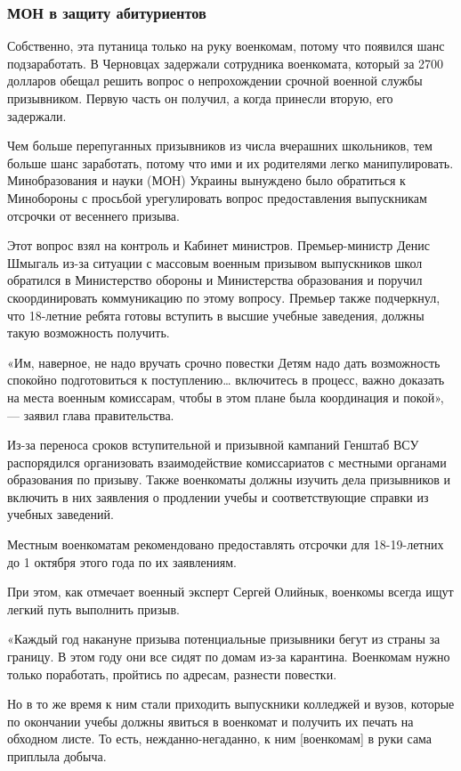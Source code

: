 \documentclass[a4paper,11pt]{extreport}
\begin{document}
\subsubsection{МОН в защиту абитуриентов }

Собственно, эта путаница только на руку военкомам, потому что появился шанс
подзаработать. В Черновцах задержали сотрудника военкомата, который за 2700
долларов обещал решить вопрос о непрохождении срочной военной службы
призывником. Первую часть он получил, а когда принесли вторую, его задержали. 

Чем больше перепуганных призывников из числа вчерашних школьников, тем больше
шанс заработать, потому что ими и их родителями легко манипулировать.
Минобразования и науки (МОН) Украины вынуждено было обратиться к Минобороны с
просьбой урегулировать вопрос предоставления выпускникам отсрочки от весеннего
призыва. 

Этот вопрос взял на контроль и Кабинет министров. Премьер-министр Денис Шмыгаль
из-за ситуации с массовым военным призывом выпускников школ обратился в
Министерство обороны и Министерства образования и поручил скоординировать
коммуникацию по этому вопросу. Премьер также подчеркнул, что 18-летние ребята
готовы вступить в высшие учебные заведения, должны такую возможность получить. 

«Им, наверное, не надо вручать срочно повестки Детям надо дать возможность
спокойно подготовиться к поступлению… включитесь в процесс, важно доказать на
места военным комиссарам, чтобы в этом плане была координация и покой», —
заявил глава правительства. 

Из-за переноса сроков вступительной и призывной кампаний Генштаб ВСУ
распорядился организовать взаимодействие комиссариатов с местными органами
образования по призыву. Также военкоматы должны изучить дела призывников и
включить в них заявления о продлении учебы и соответствующие справки из учебных
заведений. 

Местным военкоматам рекомендовано предоставлять отсрочки для 18-19-летних до 1
октября этого года по их заявлениям. 

При этом, как отмечает военный эксперт Сергей Олийнык, военкомы всегда ищут
легкий путь выполнить призыв. 

«Каждый год накануне призыва потенциальные призывники бегут из страны за
границу. В этом году они все сидят по домам из-за карантина. Военкомам нужно
только поработать, пройтись по адресам, разнести повестки. 

Но в то же время к ним стали приходить выпускники колледжей и вузов, которые по
окончании учебы должны явиться в военкомат и получить их печать на обходном
листе. То есть, нежданно-негаданно, к ним [военкомам] в руки сама приплыла
добыча. 
\end{document}
